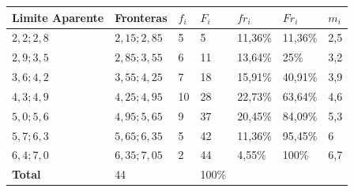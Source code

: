 \documentclass{templateNote}
\begin{document}
\begin{figure}[H]
    \centering
    \begin{tabularx}{\textwidth}{|L|L|L|L|L|L|L|}
        \hline
        \textbf{Limite Aparente} & \textbf{Fronteras}& \textbf{$f_i$} & \textbf{$F_i$} & \textbf{$fr_i$} & \textbf{$Fr_i$} & \textbf{$m_i$} \\
        \hline
        $2,2;2,8$ & $2,15;2,85$ & 5 & 5 & 11,36\% & 11,36\% & 2,5 \\
        \hline
        $2,9;3,5$ & $2,85;3,55$ & 6 & 11 & 13,64\% & 25\% & 3,2 \\
        \hline
        $3,6;4,2$ & $3,55;4,25$ & 7 & 18 & 15,91\% & 40,91\% & 3,9 \\
        \hline
        $4,3;4,9$ & $4,25;4,95$ & 10 & 28 & 22,73\% & 63,64\% & 4,6 \\
        \hline
        $5,0;5,6$ & $4,95;5,65$ & 9 & 37 & 20,45\% & 84,09\% & 5,3 \\
        \hline
        $5,7;6,3$ & $5,65;6,35$ & 5 & 42 & 11,36\% & 95,45\% & 6 \\
        \hline
        $6,4;7,0$ & $6,35;7,05$ & 2 & 44 & 4,55\% & 100\% & 6,7 \\
        \hline
        \textbf{Total} & 44 &  & 100\% & & &  \\
        \hline
    \end{tabularx}
\end{figure}
\end{document}
